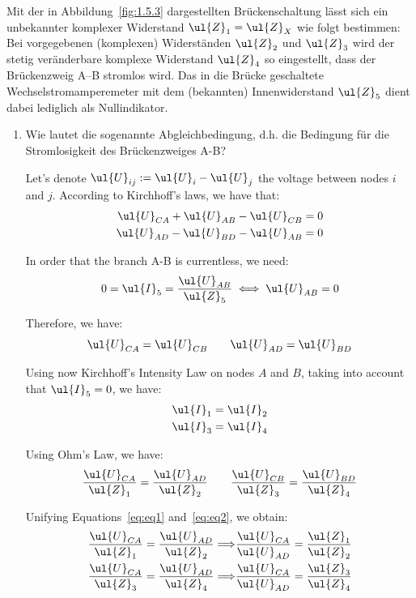 \begin{ejercicio}[Wechselstrommessbrücke]
    Mit der in Abbildung~\ref{fig:1.5.3} dargestellten Brückenschaltung lässt sich ein unbekannter komplexer Widerstand $\ul{Z}_1 = \ul{Z}_X$ wie folgt bestimmen: Bei vorgegebenen (komplexen) Widerständen $\ul{Z}_2$ und $\ul{Z}_3$ wird der stetig veränderbare komplexe Widerstand $\ul{Z}_4$ so eingestellt, dass der Brückenzweig A–B stromlos wird. Das in die Brücke geschaltete Wechselstromamperemeter mit dem (bekannten) Innenwiderstand $\ul{Z}_5$ dient dabei lediglich als Nullindikator.
    \begin{enumerate}
        \item Wie lautet die sogenannte Abgleichbedingung, d.h. die Bedingung für die Stromlosigkeit des Brückenzweiges A-B?
        
        Let's denote $\ul{U}_{ij}:= \ul{U}_i - \ul{U}_j$ the voltage between nodes $i$ and $j$.
        According to Kirchhoff's laws, we have that:
        \begin{align*}
            \ul{U}_{CA} + \ul{U}_{AB} - \ul{U}_{CB} &= 0 \\
            \ul{U}_{AD} - \ul{U}_{BD} - \ul{U}_{AB} &= 0
        \end{align*}

        In order that the branch A-B is currentless, we need:
        \begin{equation*}
            0 = \ul{I}_5 = \dfrac{\ul{U}_{AB}}{\ul{Z}_5} \iff \ul{U}_{AB} = 0
        \end{equation*}

        Therefore, we have:
        \begin{equation}\label{eq:eq1}
            \ul{U}_{CA} = \ul{U}_{CB} \qquad \ul{U}_{AD} = \ul{U}_{BD}
        \end{equation}

        Using now Kirchhoff's Intensity Law on nodes $A$ and $B$, taking into account that $\ul{I}_5=0$, we have:
        \begin{align*}
            \ul{I}_1 &= \ul{I}_2 \\
            \ul{I}_3 &= \ul{I}_4
        \end{align*}

        Using Ohm's Law, we have:
        \begin{equation}\label{eq:eq2}
            \dfrac{\ul{U}_{CA}}{\ul{Z}_1} = \dfrac{\ul{U}_{AD}}{\ul{Z}_2} \qquad
            \dfrac{\ul{U}_{CB}}{\ul{Z}_3} = \dfrac{\ul{U}_{BD}}{\ul{Z}_4}
        \end{equation}

        Unifying Equations~\eqref{eq:eq1} and~\eqref{eq:eq2}, we obtain:
        \begin{align*}
            \dfrac{\ul{U}_{CA}}{\ul{Z}_1} = \dfrac{\ul{U}_{AD}}{\ul{Z}_2} \Longrightarrow & \dfrac{\ul{U}_{CA}}{\ul{U}_{AD}} = \dfrac{\ul{Z}_1}{\ul{Z}_2} \\
            \dfrac{\ul{U}_{CA}}{\ul{Z}_3} = \dfrac{\ul{U}_{AD}}{\ul{Z}_4} \Longrightarrow & \dfrac{\ul{U}_{CA}}{\ul{U}_{AD}} = \dfrac{\ul{Z}_3}{\ul{Z}_4}
        \end{align*}


\end{enumerate}
\end{ejercicio}
